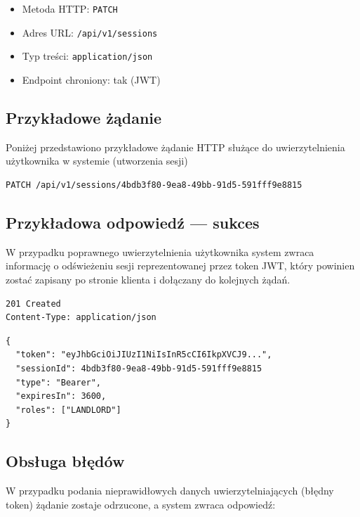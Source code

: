 \documentclass[11pt, a4paper]{article}
\begin{document}
\begin{itemize}
    \item Metoda HTTP: \texttt{PATCH}
    \item Adres URL: \texttt{/api/v1/sessions}
    \item Typ treści: \texttt{application/json}
    \item Endpoint chroniony: tak (JWT)
\end{itemize}

\subsection{Przykładowe żądanie}

Poniżej przedstawiono przykładowe żądanie HTTP służące do uwierzytelnienia
użytkownika w systemie (utworzenia sesji)

\begin{lstlisting}[style=http,caption={Przykładowe żądanie logowania}]
PATCH /api/v1/sessions/4bdb3f80-9ea8-49bb-91d5-591fff9e8815
\end{lstlisting}

\subsection{Przykładowa odpowiedź — sukces}

W przypadku poprawnego uwierzytelnienia użytkownika system zwraca informację o odświeżeniu sesji reprezentowanej przez token JWT,
który powinien zostać zapisany po stronie klienta i dołączany do kolejnych żądań.

\begin{lstlisting}[style=http,caption={Odpowiedź HTTP — sukces}]
201 Created
Content-Type: application/json

\end{lstlisting}

\begin{lstlisting}[style=json,caption={Ciało odpowiedzi — sukces}]
{
  "token": "eyJhbGciOiJIUzI1NiIsInR5cCI6IkpXVCJ9...",
  "sessionId": 4bdb3f80-9ea8-49bb-91d5-591fff9e8815
  "type": "Bearer",
  "expiresIn": 3600,
  "roles": ["LANDLORD"]
}
\end{lstlisting}

\subsection{Obsługa błędów}

W przypadku podania nieprawidłowych danych uwierzytelniających (błędny token) żądanie zostaje odrzucone, a system zwraca odpowiedź:
\end{document}
